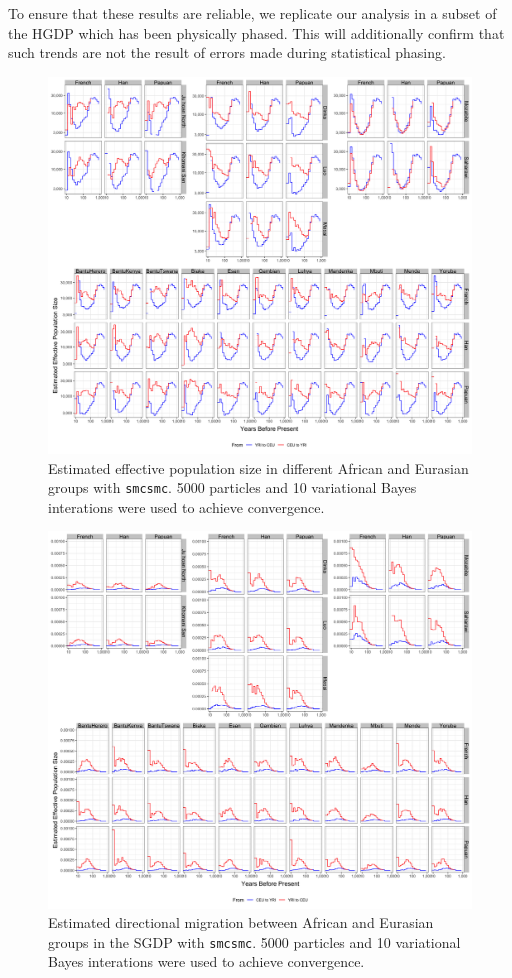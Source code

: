 \documentclass{article}
\begin{document}
To ensure that these results are reliable, we replicate our analysis in a subset of the HGDP which has been physically phased. This will additionally confirm that such trends are not the result of errors made during statistical phasing.

\begin{figure}
	\centering
	\label{sgdp_ne}
	\includegraphics[width=\linewidth]{../plot/sgdp_ne.png}
	\caption{Estimated effective population size in different African and Eurasian groups with {\tt smcsmc}. 5000 particles and 10 variational Bayes interations were used to achieve convergence.}	
\end{figure}

\begin{figure}
	\centering
	\label{sgdp_mig}
	\includegraphics[width=\linewidth]{../plot/sgdp_mig.png}
	\caption{Estimated directional migration between African and Eurasian groups in the SGDP with {\tt smcsmc}. 5000 particles and 10 variational Bayes interations were used to achieve convergence.}	
\end{figure}
\end{document}
